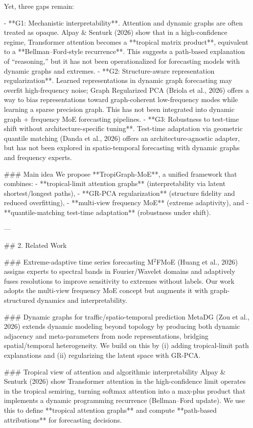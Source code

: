Yet, three gaps remain:

- **G1: Mechanistic interpretability**. Attention and dynamic graphs are often treated as opaque. Alpay & Senturk (2026) show that in a high-confidence regime, Transformer attention becomes a **tropical matrix product**, equivalent to a **Bellman–Ford-style recurrence**. This suggests a path-based explanation of “reasoning,” but it has not been operationalized for forecasting models with dynamic graphs and extremes.  
- **G2: Structure-aware representation regularization**. Learned representations in dynamic graph forecasting may overfit high-frequency noise; Graph Regularized PCA (Briola et al., 2026) offers a way to bias representations toward graph-coherent low-frequency modes while learning a sparse precision graph. This has not been integrated into dynamic graph + frequency MoE forecasting pipelines.  
- **G3: Robustness to test-time shift without architecture-specific tuning**. Test-time adaptation via geometric quantile matching (Danda et al., 2026) offers an architecture-agnostic adapter, but has not been explored in spatio-temporal forecasting with dynamic graphs and frequency experts.

### Main idea  
We propose **TropiGraph-MoE**, a unified framework that combines:  
- **tropical-limit attention graphs** (interpretability via latent shortest/longest paths),  
- **GR-PCA regularization** (structure fidelity and reduced overfitting),  
- **multi-view frequency MoE** (extreme adaptivity), and  
- **quantile-matching test-time adaptation** (robustness under shift).

---

## 2. Related Work  

### Extreme-adaptive time series forecasting  
M\(^2\)FMoE (Huang et al., 2026) assigns experts to spectral bands in Fourier/Wavelet domains and adaptively fuses resolutions to improve sensitivity to extremes without labels. Our work adopts the multi-view frequency MoE concept but augments it with graph-structured dynamics and interpretability.

### Dynamic graphs for traffic/spatio-temporal prediction  
MetaDG (Zou et al., 2026) extends dynamic modeling beyond topology by producing both dynamic adjacency and meta-parameters from node representations, bridging spatial/temporal heterogeneity. We build on this by (i) adding tropical-limit path explanations and (ii) regularizing the latent space with GR-PCA.

### Tropical view of attention and algorithmic interpretability  
Alpay & Senturk (2026) show Transformer attention in the high-confidence limit operates in the tropical semiring, turning softmax attention into a max-plus product that implements a dynamic programming recurrence (Bellman–Ford update). We use this to define **tropical attention graphs** and compute **path-based attributions** for forecasting decisions.


